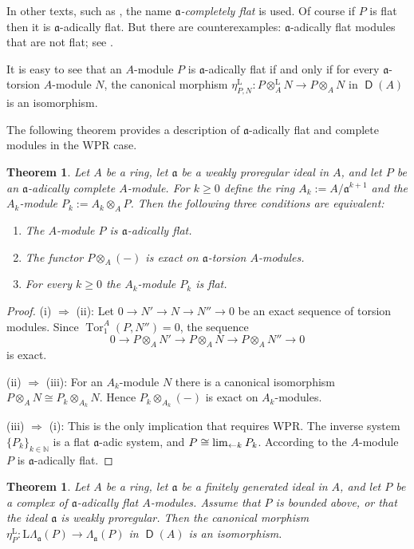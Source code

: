 \documentclass[10pt]{amsart}
\newtheorem{thm}[equation]{Theorem}
\theoremstyle{definition}
\numberwithin{equation}{section}
\newcommand{\lto}{\leftarrow}
\newcommand{\opn}{\operatorname}
\newcommand{\cat}[1]{\operatorname{\mathsf{#1}}}
\newcommand{\rmitem}[1]{\item[\textrm{(#1)}]}
\newcommand{\mfrak}[1]{\mathfrak{#1}}
\newcommand{\mrm}[1]{\mathrm{#1}}
\newcommand{\La}{\Lambda}
\renewcommand{\a}{\mfrak{a}}
\newcommand{\N}{\mathbb{N}}
\newcommand{\ot}{\otimes}
\newcommand{\msp}[1]{\mspace{#1 mu}}
\begin{document}
In other texts, such as \cite{BS}, the name {\em $\a$-completely flat} is used.
Of course if $P$ is flat then it is $\a$-adically flat.
But there are counterexamples: $\a$-adically flat modules that are not flat;
see \cite[Section 7]{Ye4}.

It is easy to see that an $A$-module $P$ is $\a$-adically flat
if and only if for every $\a$-torsion $A$-module $N$, the canonical morphism
$\eta^{\mrm{L}}_{P, N} :  P \ot^{\mrm{L}}_A N \to P \ot_A N$
in $\cat{D}(A)$ is an isomorphism.

The following theorem provides a description of $\a$-adically flat and
complete modules in the WPR case.

\begin{thm} \label{thm:502}
Let $A$ be a ring, let $\a$ be a weakly proregular ideal in $A$,
and let $P$ be an $\a$-adically complete $A$-module. For $k \geq 0$ define the
ring $A_k := A / \a^{k + 1}$ and the $A_k$-module $P_k := A_k \ot_A P$.
Then the following three conditions are equivalent:
\begin{enumerate}
\rmitem{i} The $A$-module $P$ is $\a$-adically flat.

\rmitem{ii} The functor $P \ot_{A} (-)$ is exact on $\a$-torsion $A$-modules.

\rmitem{iii} For every $k \geq 0$ the $A_k$-module $P_k$ is flat.
\end{enumerate}
\end{thm}

\begin{proof}
(i) $\Rightarrow$ (ii): Let
$0 \to N' \to N \to N'' \to 0$ be an exact sequence of torsion modules.
Since $\opn{Tor}^A_1(P, N'') = 0$, the sequence
\[ 0 \to P \ot_A N' \to P \ot_A N \to P \ot_A N'' \to 0 \]
is exact.

\medskip \noindent
(ii) $\Rightarrow$ (iii): For an $A_k$-module $N$ there is a canonical
isomorphism
$P \ot_A N \cong P_k \ot_{A_k} N$.
Hence $P_k \ot_{A_k} (-)$ is exact on $A_k$-modules.

\medskip \noindent
(iii) $\Rightarrow$ (i): This is the only implication that requires WPR.
The inverse system $\{ P_k \}_{k \in \N}$ is a flat $\a$-adic system, and
$P \cong \lim_{\lto k} \msp{1} P_k$. According to \cite[Theorem 6.9]{Ye4} the
$A$-module $P$ is $\a$-adically flat.
\end{proof}

\begin{thm} \label{thm:115}
Let $A$ be a ring, let $\a$ be a finitely generated ideal in $A$,
and let $P$ be a complex of $\a$-adically flat $A$-modules.
Assume that $P$ is bounded above, or that the ideal $\a$ is weakly proregular.
Then the canonical morphism
$\eta^{\mrm{L}}_{P} : \mrm{L} \La_{\a}(P) \to \La_{\a}(P)$
in $\cat{D}(A)$ is an isomorphism.
\end{thm}
\end{document}
